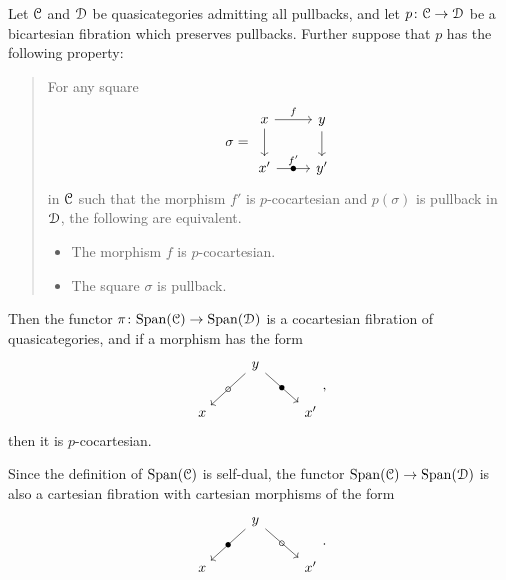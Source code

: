\documentclass[main.tex]{subfiles}
\begin{document}
\begin{theorem}
  \label{thm:span_of_bicartesian_fibration_is_bicartesian_fibration}
  Let $\mathcal{C}$ and $\mathcal{D}$ be quasicategories admitting all pullbacks, and let $p\colon \mathcal{C} \to \mathcal{D}$ be a bicartesian fibration which preserves pullbacks. Further suppose that $p$ has the following property:

  \begin{quote}
    For any square
    \begin{equation*}
      \sigma =
      \begin{tikzcd}
        x
        \arrow[r, "f"]
        \arrow[d]
        & y
        \arrow[d]
        \\
        x'
        \arrow[r, "f'", "\bullet" marking]
        & y'
      \end{tikzcd}
    \end{equation*}
    in $\mathcal{C}$ such that the morphism $f'$ is $p$-cocartesian and $p(\sigma)$ is pullback in $\mathcal{D}$, the following are equivalent.
    \begin{itemize}
      \item The morphism $f$ is $p$-cocartesian.

      \item The square $\sigma$ is pullback.
    \end{itemize}
  \end{quote}

  Then the functor $\pi\colon \mathrm{Span}(\mathcal{C}) \to \mathrm{Span}(\mathcal{D})$ is a cocartesian fibration of quasicategories, and if a morphism has the form
  \begin{equation*}
    \begin{tikzcd}
      & y
      \arrow[dl, "\circ" marking]
      \arrow[dr, "\bullet" marking]
      \\
      x
      && x'
    \end{tikzcd},
  \end{equation*}
  then it is $p$-cocartesian.
\end{theorem}

\begin{note}
  Since the definition of $\mathrm{Span}(\mathcal{C})$ is self-dual, the functor $\mathrm{Span}(\mathcal{C}) \to \mathrm{Span}(\mathcal{D})$ is also a cartesian fibration with cartesian morphisms of the form
  \begin{equation*}
    \begin{tikzcd}
      & y
      \arrow[dl, "\bullet" marking]
      \arrow[dr, "\circ" marking]
      \\
      x
      && x'
    \end{tikzcd}.
  \end{equation*}
\end{note}
\end{document}
